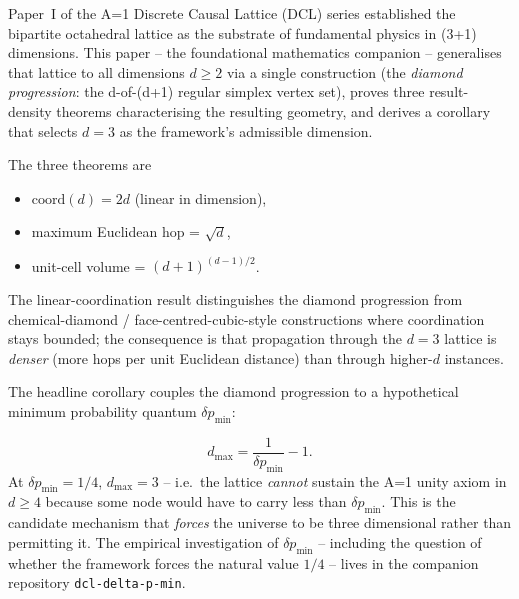 
\noindent
Paper~I of the A=1 Discrete Causal Lattice (DCL) series established
the bipartite octahedral lattice as the substrate of fundamental
physics in (3+1) dimensions.  This paper -- the foundational
mathematics companion -- generalises that lattice to all dimensions
$d \geq 2$ via a single construction (the \emph{diamond progression}:
the d-of-(d+1) regular simplex vertex set), proves three result-
density theorems characterising the resulting geometry, and derives a
corollary that selects $d = 3$ as the framework's admissible
dimension.

\medskip

\noindent
The three theorems are
\begin{itemize}
\item $\text{coord}(d) = 2d$ (linear in dimension),
\item maximum Euclidean hop = $\sqrt{d}$,
\item unit-cell volume = $(d+1)^{(d-1)/2}$.
\end{itemize}
The linear-coordination result distinguishes the diamond progression
from chemical-diamond / face-centred-cubic-style constructions where
coordination stays bounded; the consequence is that
propagation through the $d=3$ lattice is \emph{denser} (more hops
per unit Euclidean distance) than through higher-$d$ instances.

\medskip

\noindent
The headline corollary couples the diamond progression to a
hypothetical minimum probability quantum $\delta p_\min$:

\begin{equation*}
d_{\max} = \frac{1}{\delta p_\min} - 1.
\end{equation*}
At $\delta p_\min = 1/4$, $d_{\max} = 3$ -- i.e.\ the lattice
\emph{cannot} sustain the A=1 unity axiom in $d \geq 4$ because
some node would have to carry less than $\delta p_\min$.  This is the
candidate mechanism that \emph{forces} the universe to be three
dimensional rather than permitting it.  The empirical investigation of
$\delta p_\min$ -- including the question of whether the framework
forces the natural value $1/4$ -- lives in the companion repository
\texttt{dcl-delta-p-min}.

